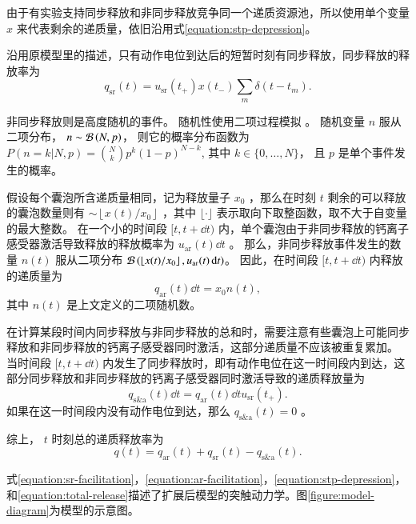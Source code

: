 由于有实验支持同步释放和非同步释放竞争同一个递质资源池\cite{Otsu2004,Wen2010}，所以使用单个变量 $x$ 来代表剩余的递质量，依旧沿用式\ref{equation:stp-depression}。

沿用原模型里的描述，只有动作电位到达后的短暂时刻有同步释放，同步释放的释放率为
\begin{equation}
q_\text{sr}(t) = u_\text{sr}(t_+)x(t_-)\sum_m \delta(t-t_m). \label{equation:sr-release}
\end{equation}

非同步释放则是高度随机的事件。
随机性使用二项过程模拟 \cite{DELCASTILLO1954}。
随机变量 $n$ 服从二项分布， $n\sim{\cal{B}}\left(N,p\right)$， 则它的概率分布函数为 $P(n=k|N,p) = \binom{N}{k} p^k (1-p)^{N-k}$, 其中 $k\in\{0,\ldots,N\}$， 且 $p$ 是单个事件发生的概率。

假设每个囊泡所含递质量相同，记为释放量子 $x_0$ ，那么在时刻 $t$ 剩余的可以释放的囊泡数量则有 $\sim \left\lfloor x(t)/x_0 \right\rfloor$ ，其中 $\lfloor \cdot \rfloor$ 表示取向下取整函数，取不大于自变量的最大整数。
在一个小的时间段 $[t,t+\dd{t})$ 内，单个囊泡由于非同步释放的钙离子感受器激活导致释放的释放概率为 $u_\text{ar}(t)\dd{t}$ 。
那么，非同步释放事件发生的数量 $n(t)$ 服从二项分布 ${\cal{B}}\left(\left\lfloor x(t)/x_0\right\rfloor,u_\text{ar}(t)\,\mathrm{d}{t}\right)$。
因此，在时间段 $[t,t+\dd{t})$ 内释放的递质量为
\begin{equation}
  q_\text{ar}(t)\dd{t} = x_0 n(t), \label{equation:ar-release}
\end{equation}
其中 $n(t)$ 是上文定义的二项随机数。

在计算某段时间内同步释放与非同步释放的总和时，需要注意有些囊泡上可能同步释放和非同步释放的钙离子感受器同时激活，这部分递质量不应该被重复累加。
当时间段 $[t,t+\dd{t})$ 内发生了同步释放时，即有动作电位在这一时间段内到达，这部分同步释放和非同步释放的钙离子感受器同时激活导致的递质释放量为
\begin{equation}
q_\text{s\&a}(t)\dd{t} = q_\text{ar}(t)\dd{t}u_\text{sr}(t_+).
\end{equation}
如果在这一时间段内没有动作电位到达，那么 $q_\text{s\&a}(t) = 0$ 。

综上， $t$ 时刻总的递质释放率为
\begin{equation}
q(t) = q_\text{ar}(t) +q_\text{sr}(t) - q_\text{s\&a}(t). \label{equation:total-release}
\end{equation}

式\ref{equation:sr-facilitation}，\ref{equation:ar-facilitation}，\ref{equation:stp-depression}，和\ref{equation:total-release}描述了扩展后模型的突触动力学。图\ref{figure:model-diagram}为模型的示意图。

